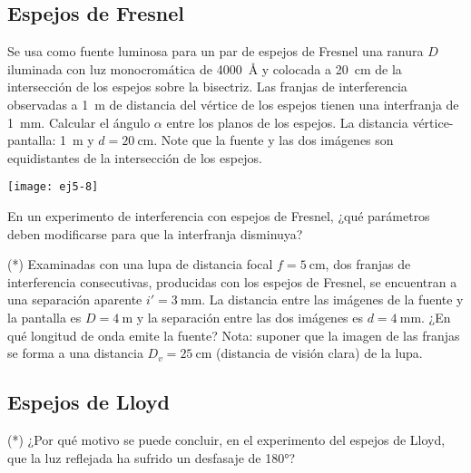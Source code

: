 \subsection*{Espejos de Fresnel}

\item 
\begin{minipage}[t][4.2cm]{0.6\textwidth}
Se usa como fuente luminosa para un par de espejos de Fresnel una ranura $D$ iluminada con luz monocromática de \SI{4000}{\angstrom} y colocada a \SI{20}{\centi\metre} de la intersección de los espejos sobre la bisectriz.
Las franjas de interferencia observadas a \SI{1}{\metre}  de distancia del vértice de los espejos tienen una interfranja de \SI{1}{\milli\metre}.
Calcular el ángulo $\alpha$ entre los planos de los espejos.
La distancia vértice-pantalla: \SI{1}{\metre} y $d = \SI{20}{\centi\metre}$.
Note que la fuente y las dos imágenes son equidistantes de la intersección de los espejos. 
\end{minipage}
\begin{minipage}[c][0cm][t]{0.35\textwidth}
	\texttt{[image: ej5-8]}
\end{minipage}



\item En un experimento de interferencia con espejos de Fresnel, ¿qué parámetros deben modificarse para que la interfranja disminuya?



\item (*) Examinadas con una lupa de distancia focal $f = \SI{5}{\centi\metre}$, dos franjas de interferencia consecutivas, producidas con los espejos de Fresnel, se encuentran a una separación aparente $i' = \SI{3}{\milli\metre}$.
	La distancia entre las imágenes de la fuente y la pantalla es $D = \SI{4}{\metre}$ y la separación entre las dos imágenes es $d = \SI{4}{\milli\metre}$.
	¿En qué longitud de onda emite la fuente?
	Nota: suponer que la imagen de las franjas se forma a una distancia $D_v = \SI{25}{\centi\metre}$ (distancia de visión clara) de la lupa.





\subsection*{Espejos de Lloyd}

\item (*) ¿Por qué motivo se puede concluir, en el experimento del espejos de Lloyd, que la luz reflejada ha sufrido un desfasaje de \ang{180;;}?

